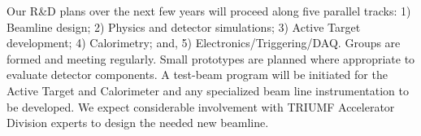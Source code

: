 Our R\&D plans over the next few years will proceed along five parallel tracks: 1) Beamline design; 2) Physics and detector simulations; 3) Active Target development; 4) Calorimetry; and, 5) Electronics/Triggering/DAQ.  Groups are formed and meeting regularly.  Small prototypes are planned where appropriate to evaluate detector components.  A test-beam program will be initiated for the Active Target and Calorimeter and any specialized beam line instrumentation to be developed.   We expect considerable involvement with TRIUMF Accelerator Division experts to design the needed new beamline.